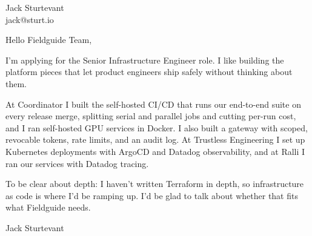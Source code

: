 \documentclass[11pt]{article}
\begin{document}
\raggedright

{\namefont\fontsize{20pt}{24pt}\selectfont Jack Sturtevant}\\[-0.3em]
jack@sturt.io

\vspace{1.2em}

Hello Fieldguide Team,

I'm applying for the Senior Infrastructure Engineer role. I like building the platform pieces that let product engineers ship safely without thinking about them.

At Coordinator I built the self-hosted CI/CD that runs our end-to-end suite on every release merge, splitting serial and parallel jobs and cutting per-run cost, and I ran self-hosted GPU services in Docker. I also built a gateway with scoped, revocable tokens, rate limits, and an audit log. At Trustless Engineering I set up Kubernetes deployments with ArgoCD and Datadog observability, and at Ralli I ran our services with Datadog tracing.

To be clear about depth: I haven't written Terraform in depth, so infrastructure as code is where I'd be ramping up. I'd be glad to talk about whether that fits what Fieldguide needs.

\vspace{0.6em}
Jack Sturtevant
\end{document}
